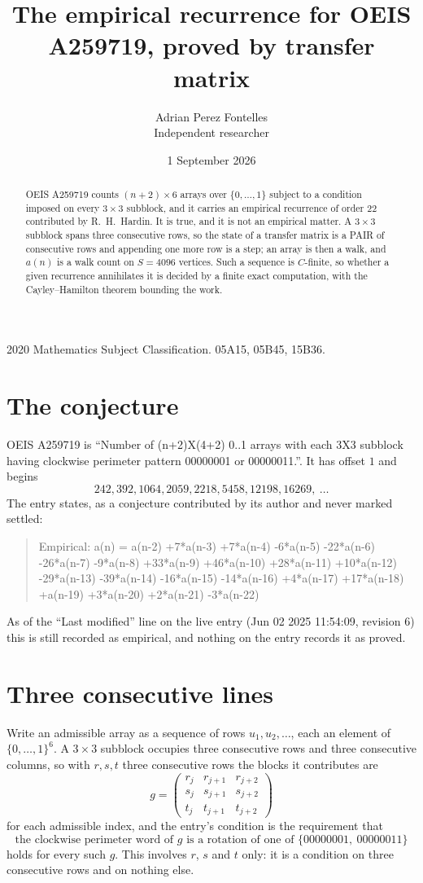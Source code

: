 \documentclass[11pt,a4paper]{article}
\title{The empirical recurrence for OEIS A259719, proved by transfer matrix}
\author{Adrian Perez Fontelles\\ \small Independent researcher}
\date{1 September 2026}
\theoremstyle{plain}
\theoremstyle{definition}
\begin{document}
\maketitle

\begin{abstract}
OEIS A259719 counts $(n+2)\times6$ arrays over $\{0,\dots,1\}$ subject to a condition imposed on
every $3\times3$ subblock, and it carries an empirical recurrence of order $22$
contributed by R.~H.~Hardin. It is true, and it is not an empirical matter. A $3\times3$
subblock spans three consecutive rows, so the state of a transfer matrix is a PAIR of
consecutive rows and appending one more row is a step; an array is then a walk, and
$a(n)$ is a walk count on $S=4096$ vertices. Such a sequence is $C$-finite, so whether a given
recurrence annihilates it is decided by a finite exact computation, with the Cayley--Hamilton
theorem bounding the work.
\end{abstract}

\noindent\small 2020 Mathematics Subject Classification. 05A15, 05B45, 15B36.\normalsize

\section{The conjecture}

OEIS A259719 is ``Number of (n+2)X(4+2) 0..1 arrays with each 3X3 subblock having clockwise perimeter pattern 00000001 or 00000011.''. It has offset $1$ and begins
\[
242, 392, 1064, 2059, 2218, 5458, 12198, 16269,\ \dots
\]
The entry states, as a conjecture contributed by its author and never marked settled:
\begin{quote}
Empirical: a(n) = a(n-2) +7*a(n-3) +7*a(n-4) -6*a(n-5) -22*a(n-6) -26*a(n-7) -9*a(n-8) +33*a(n-9) +46*a(n-10) +28*a(n-11) +10*a(n-12) -29*a(n-13) -39*a(n-14) -16*a(n-15) -14*a(n-16) +4*a(n-17) +17*a(n-18) +a(n-19) +3*a(n-20) +2*a(n-21) -3*a(n-22)
\end{quote}
As of the ``Last modified'' line on the live entry (Jun 02 2025 11:54:09, revision 6) this is still
recorded as empirical, and nothing on the entry records it as proved.

\section{Three consecutive lines}

Write an admissible array as a sequence of rows $u_1,u_2,\dots$, each an element of
$\{0,\dots,1\}^{6}$. A $3\times3$ subblock occupies three consecutive rows and
three consecutive columns, so with $r,s,t$ three consecutive rows the blocks it
contributes are
\[
g=\begin{pmatrix}r_j&r_{j+1}&r_{j+2}\\ s_j&s_{j+1}&s_{j+2}\\ t_j&t_{j+1}&t_{j+2}\end{pmatrix}
\]
for each admissible index, and the entry's condition is the requirement that
\[
\text{the clockwise perimeter word of }g\text{ is a rotation of one of }\{00000001,\ 00000011\}
\]
holds for every such $g$. This involves $r$, $s$ and $t$ only: it is a condition on
three consecutive rows and on nothing else.
\end{document}
